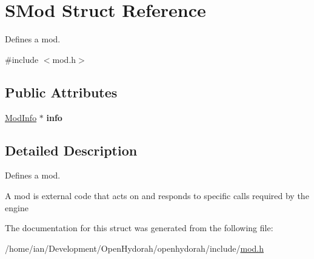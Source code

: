\hypertarget{structSMod}{\section{S\-Mod Struct Reference}
\label{structSMod}
}


Defines a mod.  




{\ttfamily \#include $<$mod.\-h$>$}

\subsection*{Public Attributes}
\begin{DoxyCompactItemize}
\item 
\hypertarget{structSMod_ac9c20709d30eb5ea6027937a5a199bf6}{\hyperlink{structSModInfo}{Mod\-Info} $\ast$ {\bfseries info}}\label{structSMod_ac9c20709d30eb5ea6027937a5a199bf6}

\end{DoxyCompactItemize}


\subsection{Detailed Description}
Defines a mod. 

A mod is external code that acts on and responds to specific calls required by the engine 

The documentation for this struct was generated from the following file\-:\begin{DoxyCompactItemize}
\item 
/home/ian/\-Development/\-Open\-Hydorah/openhydorah/include/\hyperlink{mod_8h}{mod.\-h}\end{DoxyCompactItemize}
